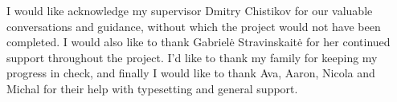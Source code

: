 
\begin{acknowledgements}      

I would like acknowledge my supervisor Dmitry Chistikov for our valuable conversations
and guidance, without which the project would not have been completed.
I would also like to thank Gabriel\.e Stravinskait\.e for her continued
support throughout the project. I'd like to thank my family
for keeping my progress in check, and finally I would like to thank
Ava, Aaron, Nicola and Michal for their help with typesetting and general
support.

\end{acknowledgements}
